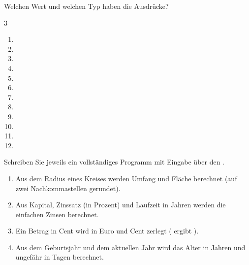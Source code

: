 Welchen Wert und welchen Typ haben die Ausdrücke?
\begin{multicols}{3}
\begin{enumerate}[label=\alph*)]
\item {}
\item {}
\item {}
\item {}
\item {}
\item {}
\item {}
\item {}
\item {}
\item {}
\item {}
\item {}
\end{enumerate}
\end{multicols}

Schreiben Sie jeweils ein vollständiges Programm mit Eingabe über den .
\begin{enumerate}[label=\alph*)]
\item Aus dem Radius eines Kreises werden Umfang und Fläche berechnet (auf zwei Nachkommastellen gerundet).
\item Aus Kapital, Zinssatz (in Prozent) und Laufzeit in Jahren werden die einfachen Zinsen berechnet.
\item Ein Betrag in Cent wird in Euro und Cent zerlegt ( ergibt ).
\item Aus dem Geburtsjahr und dem aktuellen Jahr wird das Alter in Jahren und ungefähr in Tagen berechnet.
\end{enumerate}

